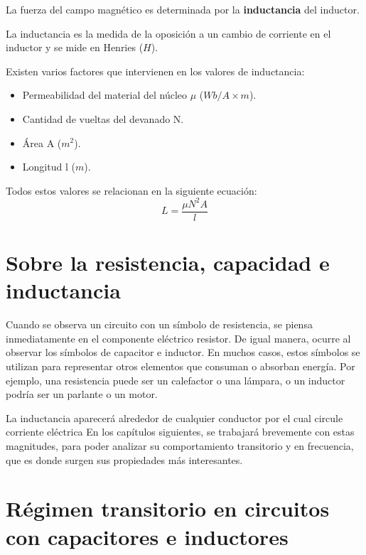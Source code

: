 La fuerza del campo magnético es determinada por la \textbf{inductancia} del inductor.

La inductancia es la medida de la oposición a un cambio de corriente en el inductor y se mide en Henries ($H$).

Existen varios factores que intervienen en los valores de inductancia:
\begin{itemize}
	\item Permeabilidad del material del núcleo $\mu$ ($Wb/A\times m$).
	\item Cantidad de vueltas del devanado N.
	\item Área A ($m^{2}$).
	\item Longitud l ($m$).
\end{itemize}

Todos estos valores se relacionan en la siguiente ecuación:
\begin{equation}
	\label{eq:inductancia}
	L= \frac{\mu N^{2}A}{l}
\end{equation}
\section{Sobre la resistencia, capacidad e inductancia}
Cuando se observa un circuito con un símbolo de resistencia, se piensa inmediatamente en el componente eléctrico resistor. De igual manera, ocurre al observar los símbolos de capacitor e inductor. En muchos casos, estos símbolos se utilizan para representar otros elementos que consuman o absorban energía. Por ejemplo, una resistencia puede ser un calefactor o una lámpara, o un inductor podría ser un parlante o un motor.

La inductancia aparecerá alrededor de cualquier conductor por el cual circule corriente eléctrica
En los capítulos siguientes, se trabajará brevemente con estas magnitudes, para poder analizar su comportamiento transitorio y en frecuencia, que es donde surgen sus propiedades más interesantes.

\section{Régimen transitorio en circuitos con capacitores e inductores}
